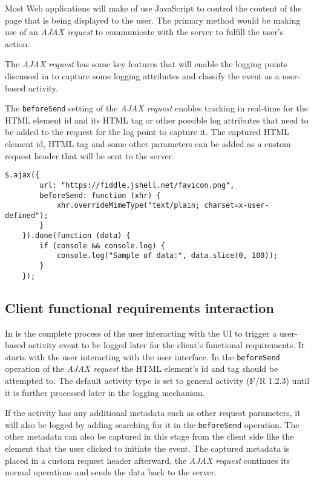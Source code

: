 Most Web applications will make of use JavaScript to control the content of the page that is being displayed to the user. The primary method would be making use of an \textit{AJAX request} to communicate with the server to fulfill the user's action.\par The \textit{AJAX request} has some key features that will enable the logging points discussed in  to capture some logging attributes and classify the event as a user-based activity. \par The \texttt{beforeSend} setting of the \textit{AJAX request} enables tracking in real-time for the HTML element id and its HTML tag or other possible log attributes that need to be added to the request for the log point to capture it. The captured HTML element id, HTML tag and some other parameters can be added as a custom request header that will be sent to the server.

\begin{lstlisting}[caption={\textit{AJAX request example \cite{API.jQuery2022}}}, label={fig:ch2_ajaxBeforesend}]  
	$.ajax({
		url: "https://fiddle.jshell.net/favicon.png",
		beforeSend: function (xhr) {
			xhr.overrideMimeType("text/plain; charset=x-user-defined");
		}
	}).done(function (data) {
		if (console && console.log) {
			console.log("Sample of data:", data.slice(0, 100));
		}
	});
\end{lstlisting}

\subsection{Client functional requirements interaction}
\par In  is the complete process of the user interacting with the UI to trigger a user-based activity event to be logged later for the client's functional requirements. It starts with the user interacting with the user interface. In the \texttt{beforeSend} operation of the \textit{AJAX request} the HTML element's id and tag should be attempted to. The default activity type is set to general activity (F/R 1.2.3) until it is further processed later in the logging mechanism.\par If the activity has any additional metadata such as other request parameters, it will also be logged by adding searching for it in the \texttt{beforeSend} operation. The other metadata can also be captured in this stage from the client side like the element that the user clicked to initiate the event. The captured metadata is placed in a custom request header afterward, the \textit{AJAX request} continues its normal operations and sends the data back to the server.

